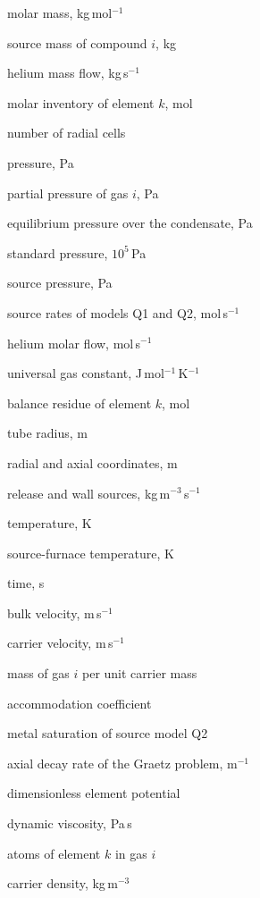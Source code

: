 {\begin{longnomenclature}
\item[$M_i$] molar mass, kg\,mol$^{-1}$
\item[$m_i$] source mass of compound $i$, kg
\item[$\dot m$] helium mass flow, kg\,s$^{-1}$
\item[$N_k$] molar inventory of element $k$, mol
\item[$N_r$] number of radial cells
\item[$p$] pressure, Pa
\item[$p_i$] partial pressure of gas $i$, Pa
\item[$p_{{\rm eq},i}$] equilibrium pressure over the condensate, Pa
\item[$p^\circ$] standard pressure, $10^5$\,Pa
\item[$p_h$] source pressure, Pa
\item[$q_{1,i}$, $q_{2,k}$] source rates of models Q1 and Q2,
  mol\,s$^{-1}$
\item[$q_{\rm He}$] helium molar flow, mol\,s$^{-1}$
\item[$R$] universal gas constant, J\,mol$^{-1}$\,K$^{-1}$
\item[$R_k$] balance residue of element $k$, mol
\item[$R_t$] tube radius, m
\item[$r$, $x$] radial and axial coordinates, m
\item[$S_i^{\rm rel}$, $S_i^{\rm wall}$] release and wall sources,
  kg\,m$^{-3}$\,s$^{-1}$
\item[$T$] temperature, K
\item[$T_h$] source-furnace temperature, K
\item[$t$] time, s
\item[$U_b$] bulk velocity, m\,s$^{-1}$
\item[$\vect{u}$] carrier velocity, m\,s$^{-1}$
\item[$Y_i$] mass of gas $i$ per unit carrier mass
\item[$\alpha_i$] accommodation coefficient
\item[$\beta$] metal saturation of source model Q2
\item[$\kappa$] axial decay rate of the Graetz problem, m$^{-1}$
\item[$\lambda_k$] dimensionless element potential
\item[$\mu$] dynamic viscosity, Pa\,s
\item[$\nu_{ki}$] atoms of element $k$ in gas $i$
\item[$\rho$] carrier density, kg\,m$^{-3}$

\end{longnomenclature}}
